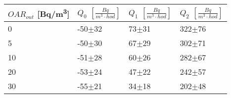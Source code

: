 \begin{tabular}{llll}
\toprule
$OAR_{out}$ [\si{Bq/m^3}] & $Q_0$ $\left[\si{\frac{Bq}{m^3\cdot hod}}\right]$ & $Q_1$ $\left[\si{\frac{Bq}{m^3\cdot hod}}\right]$ & $Q_2$ $\left[\si{\frac{Bq}{m^3\cdot hod}}\right]$ \\
\midrule
0  &                                          -50$\pm$32 &                                           73$\pm$31 &                                          322$\pm$76 \\
5  &                                          -50$\pm$30 &                                           67$\pm$29 &                                          302$\pm$71 \\
10 &                                          -51$\pm$28 &                                           60$\pm$26 &                                          282$\pm$67 \\
20 &                                          -53$\pm$24 &                                           47$\pm$22 &                                          242$\pm$57 \\
30 &                                          -55$\pm$21 &                                           34$\pm$18 &                                          202$\pm$48 \\
\bottomrule
\end{tabular}
